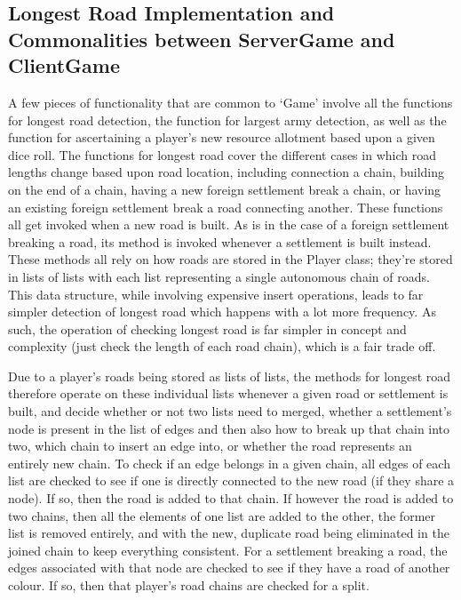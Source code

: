 \documentclass[a4paper,doc,draftfirst]{apa6}
\begin{document}
\subsection{Longest Road Implementation and Commonalities between ServerGame and ClientGame}
A few pieces of functionality that are common to ‘Game’ involve all the functions for longest road detection, the function for largest army detection, as well as the function for ascertaining a player’s new resource allotment based upon a given dice roll. The functions for longest road cover the different cases in which road lengths change based upon road location, including connection a chain, building on the end of a chain, having a new foreign settlement break a chain, or having an existing foreign settlement break a road connecting another. These functions all get invoked when a new road is built. As is in the case of a foreign settlement breaking a road, its method is invoked whenever a settlement is built instead. These methods all rely on how roads are stored in the Player class; they’re stored in lists of lists with each list representing a single autonomous chain of roads. This data structure, while involving expensive insert operations, leads to far simpler detection of longest road which happens with a lot more frequency. As such, the operation of checking longest road is far simpler in concept and complexity (just check the length of each road chain), which is a fair trade off.

Due to a player’s roads being stored as lists of lists, the methods for longest road therefore operate on these individual lists whenever a given road or settlement is built, and decide whether or not two lists need to merged, whether a settlement’s node is present in the list of edges and then also how to break up that chain into two, which chain to insert an edge into, or whether the road represents an entirely new chain. To check if an edge belongs in a given chain, all edges of each list are checked to see if one is directly connected to the new road (if they share a node). If so, then the road is added to that chain. If however the road is added to two chains, then all the elements of one list are added to the other, the former list is removed entirely, and with the new, duplicate road being eliminated in the joined chain to keep everything consistent.  For a settlement breaking a road, the edges associated with that node are checked to see if they have a road of another colour. If so, then that player’s road chains are checked for a split.
\end{document}
